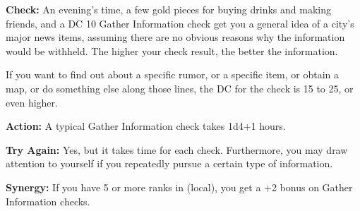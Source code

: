 
\textbf{Check:} An evening's time, a few gold pieces for buying drinks and making friends, and a DC 10 Gather Information check get you a general idea of a city's major news items, assuming there are no obvious reasons why the information would be withheld. The higher your check result, the better the information.

If you want to find out about a specific rumor, or a specific item, or obtain a map, or do something else along those lines, the DC for the check is 15 to 25, or even higher.

\textbf{Action:} A typical Gather Information check takes 1d4+1 hours.

\textbf{Try Again:} Yes, but it takes time for each check. Furthermore, you may draw attention to yourself if you repeatedly pursue a certain type of information.

\textbf{Synergy:} If you have 5 or more ranks in  (local), you get a +2 bonus on Gather Information checks.
